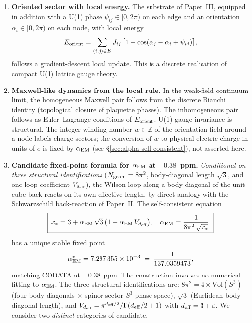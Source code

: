 \documentclass[11pt,a4paper]{article}
\begin{document}
\begin{enumerate}
\item \textbf{Oriented sector with local energy.}
The substrate of Paper~III, equipped in addition with a U(1)
phase $\psi_{ij} \in [0, 2\pi)$ on each edge and an orientation
$\alpha_i \in [0, 2\pi)$ on each node, with local energy
\begin{equation}
E_{\rm orient} = \sum_{(i,j) \in E} J_{ij}\,
\big[1 - \cos(\alpha_j - \alpha_i + \psi_{ij})\big],
\label{eq:Eorient}
\end{equation}
follows a gradient-descent local update. This is a discrete
realisation of compact U(1) lattice gauge theory.

\item \textbf{Maxwell-like dynamics from the local rule.}
In the weak-field continuum limit, the homogeneous Maxwell
pair follows from the discrete Bianchi identity (topological
closure of plaquette phases). The inhomogeneous pair follows
as Euler--Lagrange conditions of $E_{\rm orient}$. U(1) gauge
invariance is structural. The integer winding number
$w \in \mathbb{Z}$ of the orientation field around a node
labels charge sectors; the conversion of $w$ to physical
electric charge in units of $e$ is fixed by $\alpha_{\rm EM}$
(see \S\ref{sec:alpha-self-consistent}), not asserted here.

\item \textbf{Candidate fixed-point formula for
$\alpha_{\rm EM}$ at $-0.38$~ppm.}
\emph{Conditional on three structural identifications}
($N_{\rm geom} = 8\pi^2$, body-diagonal length $\sqrt{3}$, and
one-loop coefficient $V_{d_{\rm eff}}$), the Wilson loop along
a body diagonal of the unit cube back-reacts on its own
effective length, by direct analogy with the Schwarzschild
back-reaction of Paper~II. The self-consistent equation
\begin{equation}
\boxed{\;
x_* = 3 + \alpha_{\rm EM}\,\sqrt{3}\,
\big(1 - \alpha_{\rm EM}\,V_{d_{\rm eff}}\big),
\quad
\alpha_{\rm EM} = \frac{1}{8\pi^2\,\sqrt{x_*}}
\;}
\label{eq:alpha_EM_self_consistent}
\end{equation}
has a unique stable fixed point
\[
\alpha_{\rm EM}^* = 7.297\,355 \times 10^{-3}
\;=\; \frac{1}{137.0359473},
\]
matching CODATA at $-0.38$~ppm. The construction involves no
numerical fitting to $\alpha_{\rm EM}$. The three structural
identifications are: $8\pi^2 = 4 \times \mathrm{Vol}(S^3)$
(four body diagonals $\times$ spinor-sector $S^3$ phase space),
$\sqrt{3}$ (Euclidean body-diagonal length), and
$V_{d_{\rm eff}} = \pi^{d_{\rm eff}/2}/\Gamma(d_{\rm eff}/2+1)$
with $d_{\rm eff} = 3 + \varepsilon$. We consider two
\emph{distinct} categories of candidate.


\end{enumerate}
\end{document}
